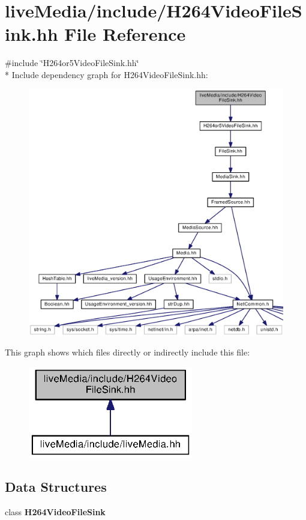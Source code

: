 \section{live\+Media/include/\+H264\+Video\+File\+Sink.hh File Reference}
\label{H264VideoFileSink_8hh}
{\ttfamily \#include \char`\"{}H264or5\+Video\+File\+Sink.\+hh\char`\"{}}\\*
Include dependency graph for H264\+Video\+File\+Sink.\+hh\+:
\nopagebreak
\begin{figure}[H]
\begin{center}
\leavevmode
\includegraphics[width=350pt]{H264VideoFileSink_8hh__incl}
\end{center}
\end{figure}
This graph shows which files directly or indirectly include this file\+:
\nopagebreak
\begin{figure}[H]
\begin{center}
\leavevmode
\includegraphics[width=204pt]{H264VideoFileSink_8hh__dep__incl}
\end{center}
\end{figure}
\subsection*{Data Structures}
\begin{DoxyCompactItemize}
\item 
class {\bf H264\+Video\+File\+Sink}
\end{DoxyCompactItemize}
